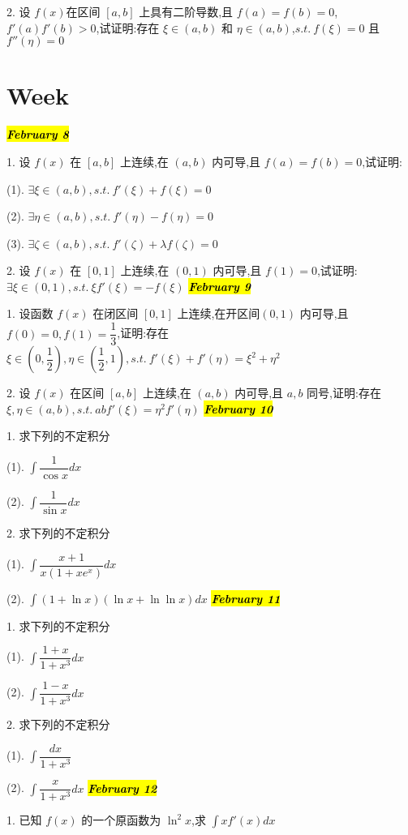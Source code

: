 2. 设 $f(x)$在区间 $[a,b]$ 上具有二阶导数,且 $f(a)=f(b)=0$,$f'(a)f'(b)>0$,试证明:存在 $\xi\in(a,b)$ 和 $\eta\in(a,b)$,$s.t.\ f(\xi)=0$ 且 $f''(\eta)=0$
\section{Week }
\hl{\textbf{\textit{February 8}}}

1. 设 $f(x)$ 在 $[a,b]$ 上连续,在 $(a,b)$ 内可导,且 $f(a)=f(b)=0$,试证明:

(1). $\exists \xi\in(a,b),s.t.\ f'(\xi)+f(\xi)=0$

(2). $\exists \eta\in(a,b),s.t.\ f'(\eta)-f(\eta)=0$

(3). $\exists \zeta\in(a,b),s.t.\ f'(\zeta)+\lambda f(\zeta)=0$

2. 设 $f(x)$ 在 $[0,1]$ 上连续,在 $(0,1)$ 内可导,且 $f(1)=0$,试证明:$\exists \xi\in(0,1),s.t.\ \xi f'(\xi)=-f(\xi)$
\hl{\textbf{\textit{February 9}}}

1. 设函数 $f(x)$ 在闭区间 $[0,1]$ 上连续,在开区间$(0,1)$ 内可导,且$f(0)=0,f(1)=\dfrac{1}{3}$,证明:存在 $\xi\in\left(0,\dfrac{1}{2}\right),\eta\in\left( \dfrac{1}{2},1\right),s.t.\ f'(\xi)+f'(\eta)=\xi^{2}+\eta^{2}$

2. 设 $f(x)$ 在区间 $[a,b]$ 上连续,在 $(a,b)$ 内可导,且 $a,b$ 同号,证明:存在$\xi,\eta\in(a,b),s.t.\ abf'(\xi)=\eta^{2}f'(\eta)$
\hl{\textbf{\textit{February 10}}}

1. 求下列的不定积分

(1). $\int \dfrac{1}{\cos x}dx$

(2). $\int \dfrac{1}{\sin x}dx$

2. 求下列的不定积分

(1). $\int \dfrac{x+1}{x(1+xe^{x})}dx$

(2). $\int (1+\ln x)(\ln x+\ln\ln x)dx$
\hl{\textbf{\textit{February 11}}}

1. 求下列的不定积分

(1). $\int \dfrac{1+x}{1+x^{3}}dx$

(2). $\int \dfrac{1-x}{1+x^{3}}dx$

2. 求下列的不定积分

(1). $\int \dfrac{dx}{1+x^{3}}$

(2). $\int \dfrac{x}{1+x^{3}}dx$
\hl{\textbf{\textit{February 12}}}

1. 已知 $f(x)$ 的一个原函数为 $\ln^{2}x$,求 $\int xf'(x)dx$

